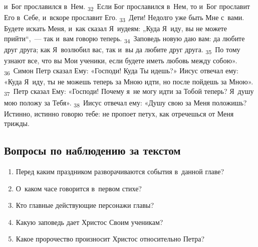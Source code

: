 \documentclass[a4paper,12pt]{article}
\begin{document}
и~Бог прославился в~Нем. \textsubscript{32}~Если Бог прославился в~Нем, то и~Бог прославит Его в~Себе, и~вскоре прославит Его. \textsubscript{33}~Дети! Недолго уже быть Мне с~вами. Будете искать Меня, и~как сказал Я~иудеям: „Куда Я~иду, вы не можете прийти“,~--- так и~вам говорю теперь. \textsubscript{34}~Заповедь новую даю вам: да любите друг друга; как Я~возлюбил вас, так и~вы да любите друг друга. \textsubscript{35}~По тому узнают все, что вы Мои ученики, если будете иметь любовь между собою». \textsubscript{36}~Симон Петр сказал Ему: «Господи! Куда Ты идешь?» Иисус отвечал ему: «Куда Я~иду, ты не можешь теперь за Мною идти, но после пойдешь за Мною». \textsubscript{37}~Петр сказал Ему: «Господи! Почему я~не могу идти за Тобой теперь? Я~душу мою положу за Тебя». \textsubscript{38}~Иисус отвечал ему: «Душу свою за Меня положишь? Истинно, истинно говорю тебе: не пропоет петух, как отречешься от Меня трижды. 

\subsection*{Вопросы по наблюдению за текстом}
\begin{enumerate}
    \item Перед каким праздником разворачиваются события в~данной главе? 
    
    \myline
    
    \myline
    \item О~каком часе говорится в~первом стихе? 
    
    \myline
    
    \myline
    \item Кто главные действующие персонажи главы? 
    
    \myline
    
    \myline
    \item Какую заповедь дает Христос Своим ученикам? 
    
    \myline
    
    \myline
    \item Какое пророчество произносит Христос относительно Петра? 
\end{enumerate}
\end{document}
